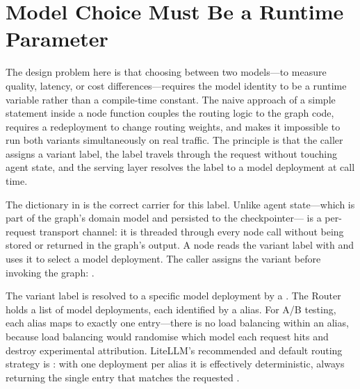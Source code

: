 \section{Model Choice Must Be a Runtime Parameter}
\label{sec:ab-routing}

The design problem here is that choosing between two models---to measure
quality, latency, or cost differences---requires the model identity to be
a runtime variable rather than a compile-time constant. The naive approach
of a simple  statement inside a node function couples the routing
logic to the graph code, requires a redeployment to change routing weights,
and makes it impossible to run both variants simultaneously on real traffic.
The principle is that the caller assigns a variant label, the label travels
through the request without touching agent state, and the serving layer
resolves the label to a model deployment at call time.

The  dictionary in  is the correct
carrier for this label. Unlike agent state---which is part of the graph's
domain model and persisted to the checkpointer--- is a
per-request transport channel: it is threaded through every node call without
being stored or returned in the graph's output. A node reads the variant label
with  and uses
it to select a model deployment. The caller assigns the variant before
invoking the graph:
.

The variant label is resolved to a specific model deployment by a
. The Router holds a list of model deployments, each
identified by a  alias. For A/B testing, each alias maps to
exactly one  entry---there is no load balancing
within an alias, because load balancing would randomise which model each
request hits and destroy experimental attribution. LiteLLM's recommended and
default routing strategy is : with one deployment per
alias it is effectively deterministic, always returning the single entry that
matches the requested .

